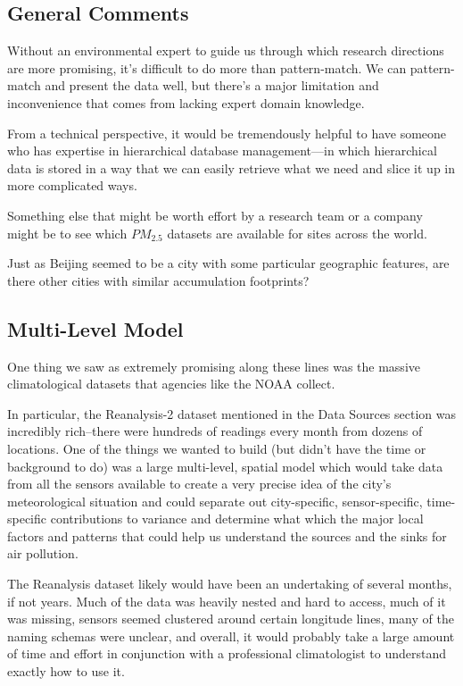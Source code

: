 \documentclass[11pt]{article} %
\begin{document}
\subsection{General Comments}

Without an environmental expert to guide us through which research directions are more promising, 
it's difficult to do more than pattern-match. We can pattern-match and present the data well, but there's a major
limitation and inconvenience that comes from lacking expert domain knowledge.

From a technical perspective, 
it would be tremendously helpful to have someone who has expertise 
in hierarchical database management---in which hierarchical data is stored in a way 
that we can easily retrieve what we need and slice it up in more complicated ways.

Something else that might be worth effort by a research team or a company might be
to see which \(PM_{2.5}\) datasets are available for sites across the world.

Just as Beijing seemed to be a city with some
particular geographic features, are there other cities with similar accumulation footprints?

\subsection{Multi-Level Model}

One thing we saw as extremely promising along these lines was the massive climatological datasets that agencies like the NOAA collect.

In particular, the Reanalysis-2 dataset mentioned in the Data Sources section was incredibly rich--there were hundreds of readings
every month from dozens of locations. One of the things we wanted to build (but didn't have the time or background to do)
was a large multi-level, spatial model which would take data from all the sensors available to create a very precise idea
of the city's meteorological situation and could separate out city-specific, sensor-specific, time-specific contributions to variance
and determine what which the major local factors and patterns that could help us understand the sources and the sinks for
air pollution. 

The Reanalysis dataset likely would have been an undertaking of several months, if not years.
Much of the data was heavily nested and hard to access, much of it was missing, sensors seemed clustered around certain longitude lines,
many of the naming schemas were unclear, and overall, it would probably take a large amount of time and effort 
in conjunction with a professional climatologist to understand exactly how to use it.
\end{document}
